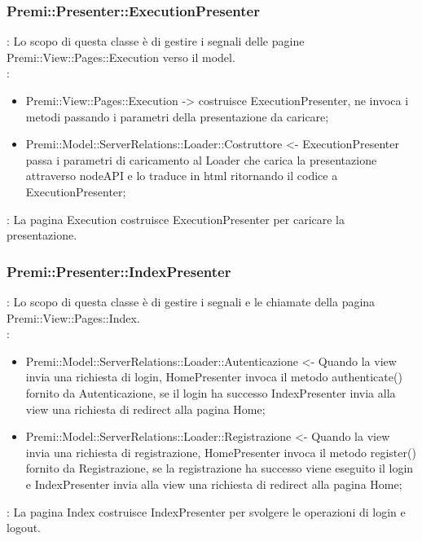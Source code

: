 {		\subsubsection{Premi::Presenter::ExecutionPresenter}{
				\textbf{\tipo}: Lo scopo di questa classe è di gestire i segnali delle pagine Premi::View::Pages::Execution verso il model.\\	
				\textbf{\relaz}:
					\begin{itemize}
						\item Premi::View::Pages::Execution -> costruisce ExecutionPresenter, ne invoca i metodi passando i parametri della presentazione da caricare;
						\item Premi::Model::ServerRelations::Loader::Costruttore <- ExecutionPresenter passa i parametri di caricamento al Loader che carica la presentazione attraverso nodeAPI e lo traduce in html ritornando il codice a ExecutionPresenter;
					\end{itemize}
				\textbf{\interfacce}: La pagina Execution costruisce ExecutionPresenter per caricare la presentazione.\\
		}
		
		\subsubsection{Premi::Presenter::IndexPresenter}{
						\textbf{\tipo}: Lo scopo di questa classe è di gestire i segnali e le chiamate della pagina Premi::View::Pages::Index.\\	
						\textbf{\relaz}:
							\begin{itemize}
								\item Premi::Model::ServerRelations::Loader::Autenticazione <- Quando la view invia una richiesta di login, HomePresenter invoca il metodo authenticate() fornito da Autenticazione, se il login ha successo IndexPresenter invia alla view una richiesta di redirect alla pagina Home;
								\item Premi::Model::ServerRelations::Loader::Registrazione <- Quando la view invia una richiesta di registrazione, HomePresenter invoca il metodo register() fornito da Registrazione, se la registrazione ha successo viene eseguito il login e IndexPresenter invia alla view una richiesta di redirect alla pagina Home;
							\end{itemize}
						\textbf{\interfacce}: La pagina Index costruisce IndexPresenter per svolgere le operazioni di login e logout.\\
				}
				
}
